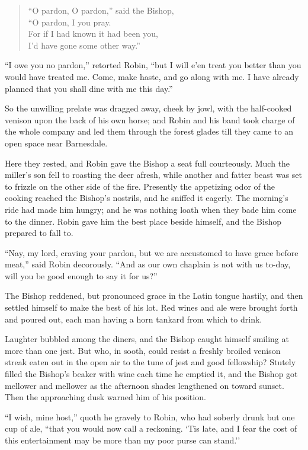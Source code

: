 \begin{quote}
“O pardon, O pardon,” said the Bishop,\\
“O pardon, I you pray.\\
For if I had known it had been you,\\
I’d have gone some other way.”
\end{quote}

``I owe you no pardon,'' retorted Robin, ``but I will e'en treat you
better than you would have treated me. Come, make haste, and go along
with me. I have already planned that you shall dine with me this day.''

So the unwilling prelate was dragged away, cheek by jowl, with the
half-cooked venison upon the back of his own horse; and Robin and his
band took charge of the whole company and led them through the forest
glades till they came to an open space near Barnesdale.

Here they rested, and Robin gave the Bishop a seat full courteously.
Much the miller's son fell to roasting the deer afresh, while another
and fatter beast was set to frizzle on the other side of the fire.
Presently the appetizing odor of the cooking reached the Bishop's
nostrils, and he sniffed it eagerly. The morning's ride had made him
hungry; and he was nothing loath when they bade him come to the dinner.
Robin gave him the best place beside himself, and the Bishop prepared to
fall to.

``Nay, my lord, craving your pardon, but we are accustomed to have grace
before meat,'' said Robin decorously. ``And as our own chaplain is not
with us to-day, will you be good enough to say it for us?''

The Bishop reddened, but pronounced grace in the Latin tongue hastily,
and then settled himself to make the best of his lot. Red wines and ale
were brought forth and poured out, each man having a horn tankard from
which to drink.

Laughter bubbled among the diners, and the Bishop caught himself smiling
at more than one jest. But who, in sooth, could resist a freshly broiled
venison streak eaten out in the open air to the tune of jest and good
fellowship? Stutely filled the Bishop's beaker with wine each time he
emptied it, and the Bishop got mellower and mellower as the afternoon
shades lengthened on toward sunset. Then the approaching dusk warned him
of his position.

``I wish, mine host,'' quoth he gravely to Robin, who had soberly drunk
but one cup of ale, ``that you would now call a reckoning. `Tis late,
and I fear the cost of this entertainment may be more than my poor purse
can stand.''

